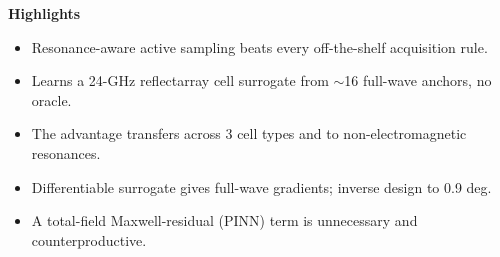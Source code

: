 \documentclass[11pt]{article}
\begin{document}
\begin{center}\textbf{Highlights}\end{center}
\begin{itemize}\itemsep2pt
\item Resonance-aware active sampling beats every off-the-shelf acquisition rule.
\item Learns a 24-GHz reflectarray cell surrogate from $\sim$16 full-wave anchors, no oracle.
\item The advantage transfers across 3 cell types and to non-electromagnetic resonances.
\item Differentiable surrogate gives full-wave gradients; inverse design to 0.9 deg.
\item A total-field Maxwell-residual (PINN) term is unnecessary and counterproductive.
\end{itemize}
\end{document}
